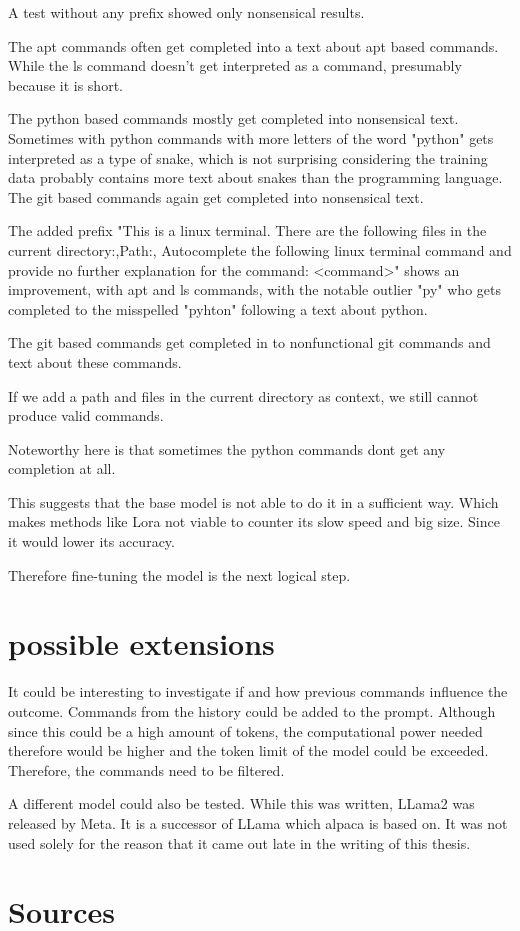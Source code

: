 A test without any prefix showed only nonsensical results.

The apt commands often get completed into a text about apt based commands. While the ls command doesn't get interpreted as a command, presumably because it is short.

The python based commands mostly get completed into nonsensical text. Sometimes with python commands with more letters of the word "python" gets interpreted as a type of snake, which is not surprising considering the training data probably contains more text about snakes than the programming language. The git based commands again get completed into nonsensical text.


The added prefix  "This is a linux terminal. There are the following files in the current  directory:,Path:, Autocomplete the following linux terminal command and provide no further explanation for the command: <command>" shows an improvement, with apt and ls commands, with the notable outlier "py" who gets completed to the misspelled "pyhton" following a text about python.

The git based commands get completed in to nonfunctional git commands and text about these commands.


If we add a path and files in the current directory as context, we still cannot produce valid commands.

Noteworthy here is that sometimes the python commands dont get any completion at all.


This suggests that the base model is not able to do it in a sufficient way. Which makes methods like Lora not viable 
 to counter its slow speed and big size. Since it would lower its accuracy. 

Therefore fine-tuning the model is the next logical step.

\section{possible extensions}

It could be interesting to investigate if and how previous commands influence the outcome. Commands from the history could be added to the prompt. Although since this could be a high amount of tokens, the computational power needed therefore would be higher and the token limit of the model could be exceeded. Therefore, the commands need to be filtered. 


A different model could also be tested. While this was written,  LLama2  was released by Meta. It is a successor of LLama which alpaca is based on. It was not used solely for the reason that it came out late in the writing of this thesis.






\section{Sources}